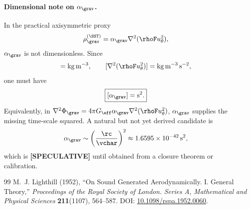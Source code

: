 \paragraph{Dimensional note on \(\alpha_{\grav}\).}
In the practical axisymmetric proxy
\begin{align}
    \rho_{\grav}^{(\SST)}
    =
    \alpha_{\grav}\nabla^2(\rhoF u_\theta^2),
\end{align}
\(\alpha_{\grav}\) is not dimensionless.  Since
\begin{align}
    [\rho_{\grav}^{(\SST)}]=\mathrm{kg\,m^{-3}},
    \qquad
    [\nabla^2(\rhoF u_\theta^2)]
    =
    \mathrm{kg\,m^{-3}\,s^{-2}},
\end{align}
one must have
\begin{align}
    \boxed{[\alpha_{\grav}]=\mathrm{s^2}.}
\end{align}
Equivalently, in
\(\nabla^2\Phi_{\grav}=4\pi G_{\eff}\alpha_{\grav}\nabla^2(\rhoF u_\theta^2)\),
\(\alpha_{\grav}\) supplies the missing time-scale squared.  A natural but not
yet derived candidate is
\begin{align}
    \alpha_{\grav}
    \sim
    \left(\frac{\rc}{\vchar}\right)^2
    \approx
    1.6595\times10^{-42}\,\mathrm{s^2},
\end{align}
which is \textbf{[SPECULATIVE]} until obtained from a closure theorem or
calibration.

\begin{thebibliography}{99}
M.~J. Lighthill (1952),
``On Sound Generated Aerodynamically. I. General Theory,''
\emph{Proceedings of the Royal Society of London. Series A, Mathematical and Physical Sciences}
\textbf{211}(1107), 564--587.
DOI: \href{https://doi.org/10.1098/rspa.1952.0060}{10.1098/rspa.1952.0060}.
\end{thebibliography}
